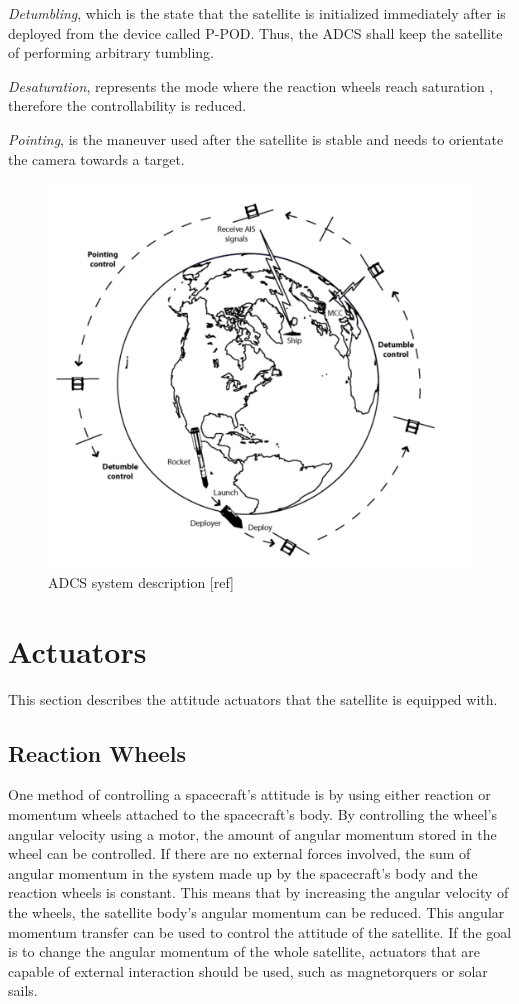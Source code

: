 \textit{Detumbling}, which is the state that the satellite is initialized immediately after is deployed from the device called P-POD. Thus, the ADCS shall keep the satellite of performing arbitrary tumbling.

\textit{Desaturation}, represents the mode where the reaction wheels reach saturation 
, therefore the controllability is reduced.

\textit{Pointing}, is the maneuver used after the satellite is stable and needs to orientate the camera towards a target.

\begin{figure}[H]
	\centering
	\includegraphics[width=0.7\linewidth]{figures/adcs}
	\caption{ADCS system description [ref]}
	\label{fig:cubee}
\end{figure}




\section{Actuators}
 This section describes the attitude actuators that the satellite is equipped with.
\subsection{Reaction Wheels}

One method of controlling a spacecraft's attitude is by using either reaction or momentum wheels attached to the spacecraft's body. By controlling the wheel's angular velocity using a motor, the amount of angular momentum stored in the wheel can be controlled. If there are no external forces involved, the sum of angular momentum in the system made up by the spacecraft's body and the reaction wheels is constant. This means that by increasing the angular velocity of the wheels, the satellite body's angular momentum can be reduced. This angular momentum transfer can be used to control the attitude of the satellite. If the goal is to change the angular momentum of the whole satellite, actuators that are capable of external interaction should be used, such as magnetorquers or solar sails.

